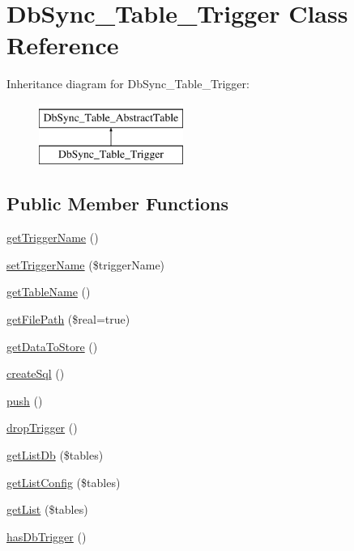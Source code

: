 \hypertarget{classDbSync__Table__Trigger}{
\section{DbSync\_\-Table\_\-Trigger Class Reference}
\label{classDbSync__Table__Trigger}
}
Inheritance diagram for DbSync\_\-Table\_\-Trigger:\begin{figure}[H]
\begin{center}
\leavevmode
\includegraphics[height=2.000000cm]{classDbSync__Table__Trigger}
\end{center}
\end{figure}
\subsection*{Public Member Functions}
\begin{DoxyCompactItemize}
\item 
\hyperlink{classDbSync__Table__Trigger_a832723eed0417c85bbd318dd275de1c5}{getTriggerName} ()
\item 
\hyperlink{classDbSync__Table__Trigger_a40056b2599be6c972ea953adbecb95da}{setTriggerName} (\$triggerName)
\item 
\hyperlink{classDbSync__Table__Trigger_a2a4c13e2d99327751869644dc053ff85}{getTableName} ()
\item 
\hyperlink{classDbSync__Table__Trigger_a56e0b413a1a52f79f639ba31fa857c55}{getFilePath} (\$real=true)
\item 
\hyperlink{classDbSync__Table__Trigger_a762c5f8968777bfb7cd6cdfeaf068aaf}{getDataToStore} ()
\item 
\hyperlink{classDbSync__Table__Trigger_ad3c52e4ee8319330a1b36fe2e838cf72}{createSql} ()
\item 
\hyperlink{classDbSync__Table__Trigger_a95e1b60f0901dc7a359e76a844f02777}{push} ()
\item 
\hyperlink{classDbSync__Table__Trigger_a88dc54dd7d029b477cbdf5759b4319f3}{dropTrigger} ()
\item 
\hyperlink{classDbSync__Table__Trigger_aa41e17e76ffaa670389421f1f82aa5f7}{getListDb} (\$tables)
\item 
\hyperlink{classDbSync__Table__Trigger_a75499be146da1f7844d1e1d403566c12}{getListConfig} (\$tables)
\item 
\hyperlink{classDbSync__Table__Trigger_a1273b3b648196b339e32a98c58b5ddaa}{getList} (\$tables)
\item 
\hyperlink{classDbSync__Table__Trigger_a6da9349bc4809ef065e6170331544a7f}{hasDbTrigger} ()
\end{DoxyCompactItemize}
